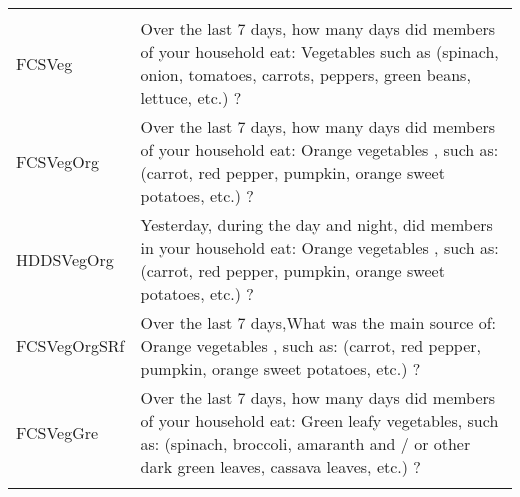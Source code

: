 \documentclass[
]{article}
\begin{document}
\begin{longtable}[]{@{}ll@{}}
\begin{minipage}[t]{0.72\columnwidth}
\end{minipage}\tabularnewline
\begin{minipage}[t]{0.22\columnwidth}\raggedright
FCSVeg\strut
\end{minipage} & \begin{minipage}[t]{0.72\columnwidth}\raggedright
Over the last 7 days, how many days did members of your household eat: Vegetables such as (spinach, onion, tomatoes, carrots, peppers, green beans, lettuce, etc.) ?\strut
\end{minipage}\tabularnewline
\begin{minipage}[t]{0.22\columnwidth}\raggedright
FCSVegOrg\strut
\end{minipage} & \begin{minipage}[t]{0.72\columnwidth}\raggedright
Over the last 7 days, how many days did members of your household eat: Orange vegetables , such as: (carrot, red pepper, pumpkin, orange sweet potatoes, etc.) ?\strut
\end{minipage}\tabularnewline
\begin{minipage}[t]{0.22\columnwidth}\raggedright
HDDSVegOrg\strut
\end{minipage} & \begin{minipage}[t]{0.72\columnwidth}\raggedright
Yesterday, during the day and night, did members in your household eat: Orange vegetables , such as: (carrot, red pepper, pumpkin, orange sweet potatoes, etc.) ?\strut
\end{minipage}\tabularnewline
\begin{minipage}[t]{0.22\columnwidth}\raggedright
FCSVegOrgSRf\strut
\end{minipage} & \begin{minipage}[t]{0.72\columnwidth}\raggedright
Over the last 7 days,What was the main source of: Orange vegetables , such as: (carrot, red pepper, pumpkin, orange sweet potatoes, etc.) ?\strut
\end{minipage}\tabularnewline
\begin{minipage}[t]{0.22\columnwidth}\raggedright
FCSVegGre\strut
\end{minipage} & \begin{minipage}[t]{0.72\columnwidth}\raggedright
Over the last 7 days, how many days did members of your household eat: Green leafy vegetables, such as: (spinach, broccoli, amaranth and / or other dark green leaves, cassava leaves, etc.) ?\strut
\end{minipage}\tabularnewline
\begin{minipage}[t]{0.22\columnwidth}\raggedright

\end{minipage}
\end{longtable}
\end{document}
